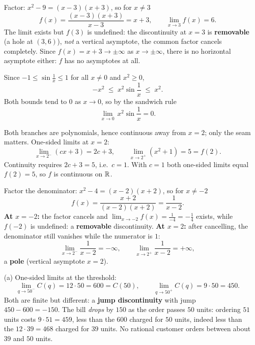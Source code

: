 \begin{solutions}
  \item Factor: $x^{2}-9=(x-3)(x+3)$, so for $x\neq 3$
        \[
          f(x)=\frac{(x-3)(x+3)}{x-3}=x+3,
          \qquad
          \lim_{x\to 3}f(x)=6 .
        \]
        The limit exists but $f(3)$ is undefined: the discontinuity at
        $x=3$ is \textbf{removable} (a hole at $(3,6)$), \emph{not} a
        vertical asymptote, the common factor cancels completely.
        Since $f(x)=x+3\to\pm\infty$ as $x\to\pm\infty$, there is no
        horizontal asymptote either: $f$ has no asymptotes at all.

  \item Since $-1\le\sin\frac{1}{x}\le 1$ for all $x\neq 0$ and
        $x^{2}\ge 0$,
        \[
          -x^{2}\;\le\; x^{2}\sin\frac{1}{x}\;\le\; x^{2}.
        \]
        Both bounds tend to $0$ as $x\to 0$, so by the sandwich rule
        \[
          \lim_{x\to 0}\,x^{2}\sin\frac{1}{x}=0 .
        \]

  \item Both branches are polynomials, hence continuous away from
        $x=2$; only the seam matters. One-sided limits at $x=2$:
        \[
          \lim_{x\to 2^{-}}(cx+3)=2c+3,
          \qquad
          \lim_{x\to 2^{+}}(x^{2}+1)=5=f(2).
        \]
        Continuity requires $2c+3=5$, i.e.\ $c=1$. With $c=1$
        both one-sided limits equal $f(2)=5$, so $f$ is continuous on
        $\mathbb{R}$.

  \item Factor the denominator: $x^{2}-4=(x-2)(x+2)$, so for
        $x\neq -2$
        \[
          f(x)=\frac{x+2}{(x-2)(x+2)}=\frac{1}{x-2}.
        \]
        \textbf{At $x=-2$:} the factor cancels and
        $\lim_{x\to-2}f(x)=\frac{1}{-4}=-\frac14$ exists, while $f(-2)$
        is undefined: a \textbf{removable} discontinuity.
        \textbf{At $x=2$:} after cancelling, the denominator still
        vanishes while the numerator is $1$:
        \[
          \lim_{x\to 2^{-}}\frac{1}{x-2}=-\infty,
          \qquad
          \lim_{x\to 2^{+}}\frac{1}{x-2}=+\infty,
        \]
        a \textbf{pole} (vertical asymptote $x=2$).

  \item (a) One-sided limits at the threshold:
        \[
          \lim_{q\to 50^{-}}C(q)=12\cdot 50=600=C(50),
          \qquad
          \lim_{q\to 50^{+}}C(q)=9\cdot 50=450 .
        \]
        Both are finite but different: a \textbf{jump discontinuity}
        with jump $450-600=-150$. The bill \emph{drops} by $150$ as the
        order passes $50$ units: ordering $51$ units costs
        $9\cdot 51=459$, less than the $600$ charged for $50$ units,
        indeed less than the $12\cdot 39=468$ charged for $39$ units.
        No rational customer orders between about $39$ and $50$ units.


\end{solutions}
